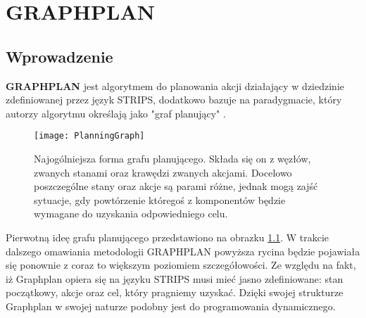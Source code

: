 \chapter{GRAPHPLAN}
\thispagestyle{chapterBeginStyle}

\section{Wprowadzenie}
    \textbf{GRAPHPLAN} jest algorytmem do planowania akcji działający w dziedzinie zdefiniowanej
    przez język STRIPS, dodatkowo bazuje na paradygmacie, który autorzy algorytmu określają jako "graf planujący" \cite{GRAPHPLAN}.
    \begin{figure}[H]
        \texttt{[image: PlanningGraph]}
        \centering
        \caption{Najogólniejsza forma grafu planującego. Składa się on z węzłów, zwanych stanami oraz krawędzi zwanych akcjami. Docelowo poszczególne 
        stany oraz akcje są parami różne, jednak mogą zajść sytuacje, gdy powtórzenie któregoś z komponentów będzie wymagane do uzyskania odpowiedniego
        celu.}
        \label{PlanningGraph}
    \end{figure}
    Pierwotną ideę grafu planującego przedstawiono na obrazku \ref{PlanningGraph}. W trakcie dalszego omawiania metodologii GRAPHPLAN powyższa 
    rycina będzie pojawiała się ponownie z coraz to większym poziomiem szczegółowości.
    Ze względu na fakt, iż Graphplan opiera się na języku STRIPS musi mieć jasno zdefiniowane: stan początkowy, akcje oraz cel, który pragniemy uzyskać.
    Dzięki swojej strukturze Graphplan w swojej naturze podobny jest do programowania dynamicznego.

